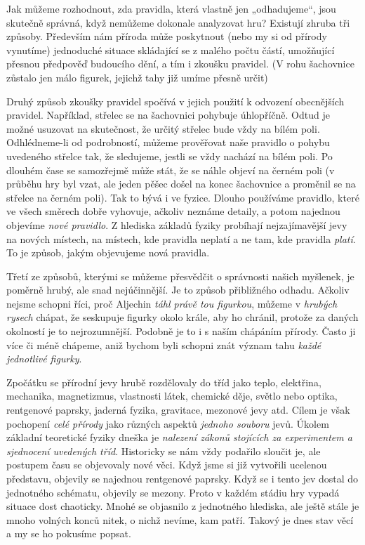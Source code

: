     Jak můžeme rozhodnout, zda pravidla, která vlastně jen „odhadujeme“, jsou skutečně správná, 
    když nemůžeme dokonale analyzovat hru? Existují zhruba tři způsoby. Především nám příroda může 
    poskytnout (nebo my si od přírody vynutíme) jednoduché situace skládající se z malého počtu 
    částí, umožňující přesnou předpověď budoucího dění, a tím i zkoušku pravidel. (V rohu 
    šachovnice zůstalo jen málo figurek, jejichž tahy již umíme přesně určit)

    Druhý způsob zkoušky pravidel spočívá v jejich použití k odvození obecnějších pravidel.
    Například, střelec se na šachovnici pohybuje úhlopříčně. Odtud je možné usuzovat na skutečnost,
    že určitý střelec bude vždy na bílém poli. Odhlédneme-li od podrobností, můžeme prověřovat naše
    pravidlo o pohybu uvedeného střelce tak, že sledujeme, jestli se vždy nachází na bílém poli. Po
    dlouhém čase se samozřejmě může stát, že se náhle objeví na černém poli (v průběhu hry byl vzat,
    ale jeden pěšec došel na konec šachovnice a proměnil se na střelce na černém poli). Tak to bývá
    i ve fyzice. Dlouho používáme pravidlo, které ve všech směrech dobře vyhovuje, ačkoliv neznáme
    detaily, a potom najednou objevíme \emph{nové pravidlo}. Z hlediska základů fyziky probíhají
    nejzajímavější jevy na nových místech, na místech, kde pravidla neplatí a ne tam, kde pravidla
    \emph{platí}. To je způsob, jakým objevujeme nová pravidla.

    Třetí ze způsobů, kterými se můžeme přesvědčit o správnosti našich myšlenek, je poměrně hrubý, 
    ale snad nejúčinnější. Je to způsob přibližného odhadu. Ačkoliv nejsme schopni říci, proč 
    Aljechin \emph{táhl právě tou figurkou}, můžeme v \emph{hrubých rysech} chápat, že seskupuje 
    figurky okolo krále, aby ho chránil, protože za daných okolností je to nejrozumnější. Podobně 
    je to i s naším chápáním přírody. Často ji více či méně chápeme, aniž bychom byli schopni znát 
    význam tahu \emph{každé jednotlivé figurky}.
    
    Zpočátku se přírodní jevy hrubě rozdělovaly do tříd jako teplo, elektřina, mechanika, 
    magnetizmus, vlastnosti látek, chemické děje, světlo nebo optika, rentgenové paprsky, jaderná 
    fyzika, gravitace, mezonové jevy atd. Cílem je však pochopení \emph{celé přírody} jako různých 
    aspektů \emph{jednoho souboru} jevů. Úkolem základní teoretické fyziky dneška je \emph{nalezení 
    zákonů stojících za experimentem a sjednocení uvedených tříd}. Historicky se nám vždy podařilo 
    sloučit je, ale postupem času se objevovaly nové věci. Když jsme si již vytvořili ucelenou 
    představu, objevily se najednou rentgenové paprsky. Když se i tento jev dostal do jednotného 
    schématu, objevily se mezony. Proto v každém stádiu hry vypadá situace dost chaoticky. Mnohé se 
    objasnilo z jednotného hlediska, ale ještě stále je mnoho volných konců nitek, o nichž nevíme, 
    kam patří. Takový je dnes stav věcí a my se ho pokusíme popsat.
    
